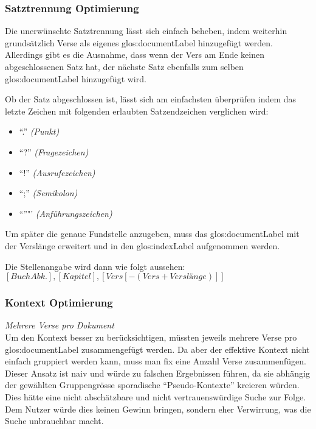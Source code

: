 \subsubsection{Satztrennung Optimierung}
Die unerwünschte Satztrennung lässt sich einfach beheben, indem weiterhin grundsätzlich Verse als eigenes \gls{glos:documentLabel} hinzugefügt werden.
Allerdings gibt es die Ausnahme, dass wenn der Vers am Ende keinen abgeschlossenen Satz hat, der nächste Satz ebenfalls zum selben \gls{glos:documentLabel} hinzugefügt wird.

Ob der Satz abgeschlossen ist, lässt sich am einfachsten überprüfen indem das letzte Zeichen mit folgenden erlaubten Satzendzeichen verglichen wird:
\begin{itemize}
	\item "`."' \textit{(Punkt)}
	\item "`?"' \textit{(Fragezeichen)}
	\item "`!"' \textit{(Ausrufezeichen)}
	\item "`;"' \textit{(Semikolon)}
	\item "`"'"' \textit{(Anführungszeichen)}
\end{itemize}

Um später die genaue Fundstelle anzugeben, muss das \gls{glos:documentLabel} mit der Verslänge erweitert und in den \gls{glos:indexLabel} aufgenommen werden.

Die Stellenangabe wird dann wie folgt aussehen:\\
$[Buch Abk.], [Kapitel],[Vers[-(Vers + Verslänge)]]$

\subsubsection{Kontext Optimierung}
\label{sec:contextOptimaze}
\textit{Mehrere Verse pro Dokument}
\vspace{0.5em}\\
Um den Kontext besser zu berücksichtigen, müssten jeweils mehrere Verse pro \gls{glos:documentLabel} zusammengefügt werden.
Da aber der effektive Kontext nicht einfach gruppiert werden kann, muss man fix eine Anzahl Verse zusammenfügen.
Dieser Ansatz ist naiv und würde zu falschen Ergebnissen führen, da sie abhängig der gewählten Gruppengrösse sporadische "`Pseudo-Kontexte"' kreieren würden.
Dies hätte eine nicht abschätzbare und nicht vertrauenswürdige Suche zur Folge.
Dem Nutzer würde dies keinen Gewinn bringen, sondern eher Verwirrung, was die Suche unbrauchbar macht.

